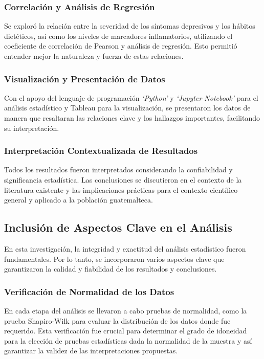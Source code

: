\documentclass[jou]{apa7}
\begin{document}
	\subsubsection{Correlación y Análisis de Regresión} Se exploró la relación
	entre la severidad de los síntomas depresivos y los hábitos dietéticos,
	así como los niveles de marcadores inflamatorios, utilizando el
	coeficiente de correlación de Pearson y análisis de regresión. Esto permitió
	entender mejor la naturaleza y fuerza de estas relaciones.

	\subsubsection{Visualización y Presentación de Datos}
	Con el apoyo del lenguaje de programación \emph{`Python'} y \emph{`Jupyter Notebook'} para el análisis estadístico y Tableau para la visualización, se presentaron los datos de manera que resaltaran las relaciones clave y los hallazgos importantes, facilitando su interpretación.

	\subsubsection{Interpretación Contextualizada de Resultados}
	Todos los resultados fueron interpretados considerando la confiabilidad y significancia estadística. Las conclusiones se discutieron en el contexto de la literatura existente y las implicaciones prácticas para el contexto científico general y aplicado a la población guatemalteca.

	\subsection{Inclusión de Aspectos Clave en el Análisis}\label{inclusiuxf3n-de-aspectos-clave-en-el-anuxe1lisis}

	En esta investigación, la integridad y exactitud del análisis
	estadístico fueron fundamentales. Por lo tanto, se incorporaron varios
	aspectos clave que garantizaron la calidad y fiabilidad de los
	resultados y conclusiones.\\

	\subsubsection{Verificación de Normalidad de los Datos}
	En cada etapa del análisis se llevaron a cabo pruebas de normalidad, como la prueba
	Shapiro-Wilk para evaluar la distribución de los datos donde fue
	requerido. Esta verificación fue crucial para determinar el grado de
	idoneidad para la elección de pruebas estadísticas dada la normalidad de la
	muestra y así garantizar la validez de las interpretaciones propuestas.
\end{document}
